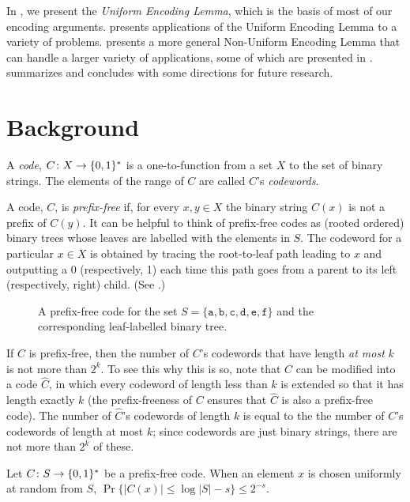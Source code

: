 \documentclass[lotsofwhite]{patmorin}
\begin{document}
In , we present the \emph{Uniform Encoding Lemma}, which is
the basis of most of our encoding arguments.  
presents  applications of the Uniform Encoding Lemma to a variety of
problems.   presents a more general Non-Uniform Encoding
Lemma that can handle a larger variety of applications, some of which are
presented in .   summarizes
and concludes with some directions for future research.



\section{Background}

A \emph{code}, $C\colon X\to \{0,1\}^*$ is a one-to-function from a set
$X$ to the set of binary strings.  The elements of the range of $C$ are
called $C$'s \emph{codewords}.

A code, $C$, is \emph{prefix-free} if, for every $x,y\in X$ the binary
string $C(x)$ is not a prefix of $C(y)$.  It can be helpful to think
of prefix-free codes as (rooted ordered) binary trees whose leaves
are labelled with the elements in $S$.  The codeword for a particular
$x\in X$ is obtained by tracing the root-to-leaf path leading to $x$
and outputting a 0 (respectively, 1) each time this path goes from a
parent to its left (respectively, right) child. (See .)

\begin{figure}
  \caption{A prefix-free code for the set
    $S=\{\mathtt{a},\mathtt{b},\mathtt{c},\mathtt{d},\mathtt{e},\mathtt{f}\}$
    and the corresponding leaf-labelled binary tree.}
\end{figure}

If $C$ is prefix-free, then the number of $C$'s codewords that have
length \emph{at most} $k$ is not more than $2^k$. To see this why this
is so, note that $C$ can be modified into a code $\hat C$, in which
every codeword of length less than $k$ is extended so that it has length
exactly $k$ (the prefix-freeness of $C$ ensures that $\hat C$ is also a
prefix-free code). The number of $\hat C$'s codewords of length $k$ is
equal to the the number of $C$'s codewords of length at most $k$; since
codewords are just binary strings, there are not more than $2^k$ of these.

\begin{lem}
  Let $C\colon S\to \{0,1\}^*$ be a prefix-free code. When an element $x$
  is chosen uniformly at random from $S$, $\Pr\{|C(x)|\le \log|S|-s\}\le
  2^{-s}$.
\end{lem}
\end{document}
